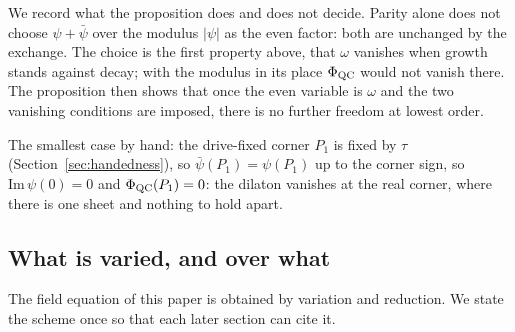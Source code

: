 We record what the proposition does and does not decide. Parity alone does
not choose $\psi+\bar\psi$ over the modulus $\lvert\psi\rvert$ as the even
factor: both are unchanged by the exchange. The choice is the first property above, that $\omega$ vanishes
when growth stands against decay; with the modulus in its place $\Phi_{\mathrm{QC}}$ would
not vanish there. The proposition then shows that once the even variable is
$\omega$ and the two vanishing conditions are imposed, there is no further
freedom at lowest order.

The smallest case by hand: the drive-fixed corner $P_{1}$ is fixed by $\tau$
(Section~\ref{sec:handedness}), so $\bar\psi(P_{1})=\psi(P_{1})$ up to the
corner sign, so $\mathrm{Im}\,\psi(0)=0$ and
$\Phi_{\mathrm{QC}}(P_{1})=0$: the dilaton vanishes at the real corner, where there is one
sheet and nothing to hold apart.

\subsection{What is varied, and over what}\label{sec:scheme}

The field equation of this paper is obtained by variation and reduction. We
state the scheme once so that each later section can cite it.

